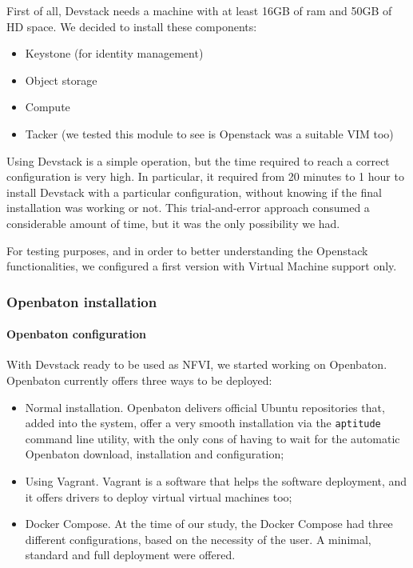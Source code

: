 First of all, Devstack needs a machine with at least 16GB of ram and 50GB of HD 
space.
We decided to install these components:
\begin{itemize}
 \item Keystone (for identity management)
 \item Object storage
 \item Compute
 \item Tacker (we tested this module to see is Openstack was a suitable VIM too)
\end{itemize}

Using Devstack is a simple operation, but the time required to reach a correct 
configuration is very high. In particular, it required from 20 minutes to 1 
hour to install Devstack with a particular configuration, without knowing if the 
final installation was working or not. This trial-and-error approach consumed a 
considerable amount of time, but it was the only possibility we had.

For testing purposes, and in order to better understanding the Openstack
functionalities, we configured a first version with Virtual Machine support
only.

\subsubsection{Openbaton installation}
\paragraph*{Openbaton configuration}
With Devstack ready to be used as NFVI, we started working on Openbaton.
Openbaton currently offers three ways to be deployed:
\begin{itemize}
  \item Normal installation. Openbaton delivers official Ubuntu repositories
    that, added into the system, offer a very smooth installation via the
    \verb!aptitude! command line utility, with the only cons of having to wait
    for the automatic Openbaton download, installation and configuration;
  \item Using Vagrant. Vagrant is a software that helps the software deployment,
    and it offers drivers to deploy virtual virtual machines too;
  \item Docker Compose. At the time of our study, the Docker Compose had three
    different configurations, based on the necessity of the user. A minimal,
    standard and full deployment were offered.
\end{itemize}


